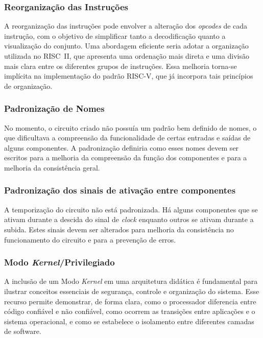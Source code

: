 \documentclass[
	12pt,				%
	openright,			%
	oneside,			%
	a4paper,			%
	english,			%
	french,				%
	spanish,			%
	brazil,				%
	]{abntex2}
\begin{document}
\subsubsection{Reorganização das Instruções}\label{recursos_reorganizacao}%

A reorganização das instruções pode envolver a alteração dos \textit{opcodes} de cada instrução, com o objetivo de simplificar tanto a decodificação quanto a visualização do conjunto. Uma abordagem eficiente seria adotar a organização utilizada no RISC~II, que apresenta uma ordenação mais direta e uma divisão mais clara entre os diferentes grupos de instruções. Essa melhoria torna-se implícita na implementação do padrão RISC-V, que já incorpora tais princípios de organização.

\subsubsection{Padronização de Nomes}\label{recursos_padronizacao_nome}%

No momento, o circuito criado não possuía um padrão bem definido de nomes, o que dificultava a compreensão da funcionalidade de certas entradas e saídas de alguns componentes. A padronização definiria como esses nomes devem ser escritos para a melhoria da compreensão da função dos componentes e para a melhoria da consistência geral.

\subsubsection{Padronização dos sinais de ativação entre componentes}\label{recursos_padronizacao_sinais}%

A temporização do circuito não está padronizada. Há alguns componentes que se ativam durante a descida do sinal de \textit{clock} enquanto outros se ativam durante a subida. Estes sinais devem ser alterados para melhoria da consistência no funcionamento do circuito e para a prevenção de erros.

\subsubsection{Modo \textit{Kernel}/Privilegiado}\label{recursos_kernel}%
A inclusão de um Modo \textit{Kernel} em uma arquitetura didática é fundamental para ilustrar conceitos essenciais de segurança, controle e organização do sistema. Esse recurso permite demonstrar, de forma clara, como o processador diferencia entre código confiável e não confiável, como ocorrem as transições entre aplicações e o sistema operacional, e como se estabelece o isolamento entre diferentes camadas de software.
\end{document}
